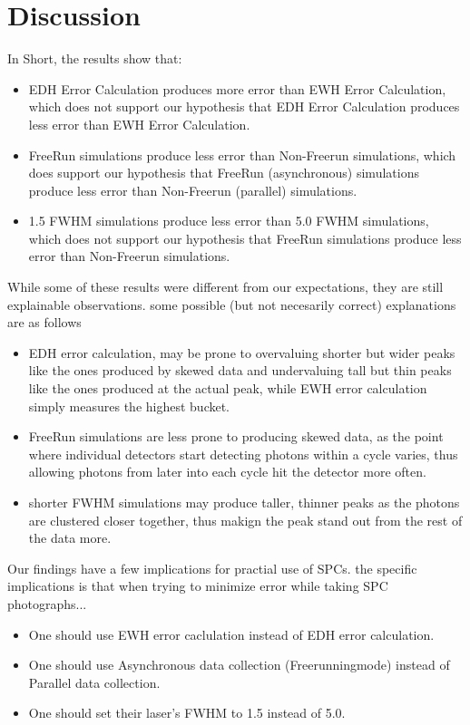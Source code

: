 \documentclass{article}
\begin{document}
\section*{Discussion}
In Short, the results show that:
\begin{itemize}
  \item EDH Error Calculation produces more error than EWH Error Calculation, which does not support our hypothesis that EDH Error Calculation produces less error than EWH Error Calculation.
  \item FreeRun simulations produce less error than Non-Freerun simulations, which does support our hypothesis that FreeRun (asynchronous) simulations produce less error than Non-Freerun (parallel) simulations.
  \item 1.5 FWHM simulations produce less error than 5.0 FWHM simulations, which does not support our hypothesis that FreeRun simulations produce less error than Non-Freerun simulations.
\end{itemize}
While some of these results were different from our expectations, they are still explainable observations. some possible (but not necesarily correct) explanations are as follows
\begin{itemize}
\item EDH error calculation, may be prone to overvaluing shorter but wider peaks like the ones produced by skewed data and undervaluing tall but thin peaks like the ones produced at the actual peak, while EWH error calculation simply measures the highest bucket.
  \item FreeRun simulations are less prone to producing skewed data, as the point where individual detectors start detecting photons within a cycle varies, thus allowing photons from later into each cycle hit the detector more often.
  \item shorter FWHM simulations may produce taller, thinner peaks as the photons are clustered closer together, thus makign the peak stand out from the rest of the data more.
\end{itemize}
Our findings have a few implications for practial use of SPCs. the specific implications is that when trying to minimize error while taking SPC photographs...
\begin{itemize}
  \item One should use EWH error caclulation instead of EDH error calculation.
  \item One should use Asynchronous data collection (Freerunningmode) instead of Parallel data collection.
  \item One should set their laser's FWHM to 1.5 instead of 5.0.
\end{itemize}
\end{document}
